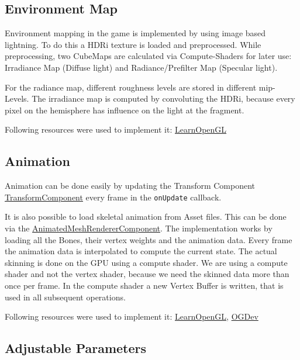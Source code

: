 \documentclass{article}
\begin{document}
    \subsection{Environment Map}
    \label{sec:environmentMap}

    Environment mapping in the game is implemented by using image based lightning. To do this a HDRi texture is loaded and preprocessed. While preprocessing, two CubeMaps are calculated via Compute-Shaders for later use: Irradiance Map (Diffuse light) and Radiance/Prefilter Map (Specular light).

    For the radiance map, different roughness levels are stored in different mip-Levels. The irradiance map is computed by convoluting the HDRi, because every pixel on the hemisphere has influence on the light at the fragment.

    Following resources were used to implement it: \href{https://learnopengl.com/PBR/IBL/Diffuse-irradiance}{LearnOpenGL}

    \subsection{Animation}

    Animation can be done easily by updating the Transform Component \href{https://github.com/Liioooo/cgue23-pac3D/blob/master/docs/md/COMPONENTS_DOCS.md#transformcomponent}{TransformComponent} every frame in the \verb|onUpdate| callback.

    It is also possible to load skeletal animation from Asset files. This can be done via the \href{https://github.com/Liioooo/cgue23-pac3D/blob/master/docs/md/COMPONENTS_DOCS.md#animatedmeshrenderercomponent}{AnimatedMeshRendererComponent}. The implementation works by loading all the Bones, their vertex weights and the animation data. Every frame the animation data is interpolated to compute the current state. The actual skinning is done on the GPU using a compute shader. We are using a compute shader and not the vertex shader, because we need the skinned data more than once per frame. In the compute shader a new Vertex Buffer is written, that is used in all subsequent operations.

    Following resources were used to implement it: \href{https://learnopengl.com/Guest-Articles/2020/Skeletal-Animation}{LearnOpenGL}, \href{https://ogldev.org/www/tutorial38/tutorial38.html}{OGDev}

    \subsection{Adjustable Parameters}
\end{document}
